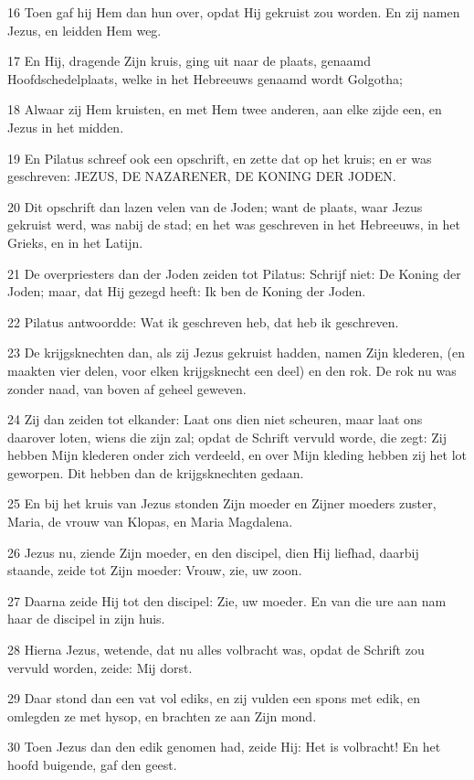 \par 16 Toen gaf hij Hem dan hun over, opdat Hij gekruist zou worden. En zij namen Jezus, en leidden Hem weg.
\par 17 En Hij, dragende Zijn kruis, ging uit naar de plaats, genaamd Hoofdschedelplaats, welke in het Hebreeuws genaamd wordt Golgotha;
\par 18 Alwaar zij Hem kruisten, en met Hem twee anderen, aan elke zijde een, en Jezus in het midden.
\par 19 En Pilatus schreef ook een opschrift, en zette dat op het kruis; en er was geschreven: JEZUS, DE NAZARENER, DE KONING DER JODEN.
\par 20 Dit opschrift dan lazen velen van de Joden; want de plaats, waar Jezus gekruist werd, was nabij de stad; en het was geschreven in het Hebreeuws, in het Grieks, en in het Latijn.
\par 21 De overpriesters dan der Joden zeiden tot Pilatus: Schrijf niet: De Koning der Joden; maar, dat Hij gezegd heeft: Ik ben de Koning der Joden.
\par 22 Pilatus antwoordde: Wat ik geschreven heb, dat heb ik geschreven.
\par 23 De krijgsknechten dan, als zij Jezus gekruist hadden, namen Zijn klederen, (en maakten vier delen, voor elken krijgsknecht een deel) en den rok. De rok nu was zonder naad, van boven af geheel geweven.
\par 24 Zij dan zeiden tot elkander: Laat ons dien niet scheuren, maar laat ons daarover loten, wiens die zijn zal; opdat de Schrift vervuld worde, die zegt: Zij hebben Mijn klederen onder zich verdeeld, en over Mijn kleding hebben zij het lot geworpen. Dit hebben dan de krijgsknechten gedaan.
\par 25 En bij het kruis van Jezus stonden Zijn moeder en Zijner moeders zuster, Maria, de vrouw van Klopas, en Maria Magdalena.
\par 26 Jezus nu, ziende Zijn moeder, en den discipel, dien Hij liefhad, daarbij staande, zeide tot Zijn moeder: Vrouw, zie, uw zoon.
\par 27 Daarna zeide Hij tot den discipel: Zie, uw moeder. En van die ure aan nam haar de discipel in zijn huis.
\par 28 Hierna Jezus, wetende, dat nu alles volbracht was, opdat de Schrift zou vervuld worden, zeide: Mij dorst.
\par 29 Daar stond dan een vat vol ediks, en zij vulden een spons met edik, en omlegden ze met hysop, en brachten ze aan Zijn mond.
\par 30 Toen Jezus dan den edik genomen had, zeide Hij: Het is volbracht! En het hoofd buigende, gaf den geest.
